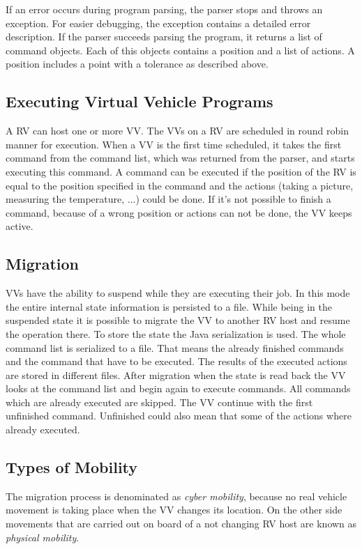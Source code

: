 If an error occurs during program parsing, the parser stops and throws an exception. For easier debugging, the exception
contains a detailed error description. If the parser succeeds parsing the program, it returns a list of command objects.
Each of this objects contains a position and a list of actions.
A position includes a point with a tolerance as described above.

\subsection{Executing Virtual Vehicle Programs}

A \ac{RV} can host one or more \ac{VV}. The \acp{VV} on a \ac{RV} are scheduled in round robin manner for
execution. When a \ac{VV} is the first time scheduled, it takes the first command from the command list, which was
returned from the parser, and starts executing this command. A command can be executed if the position of the \ac{RV} is
equal to the position specified in the command and the actions (taking a picture, measuring the temperature, ...) could be done.
If it's not possible to finish a command, because of a wrong position or actions can not be done, the \ac{VV} keeps
active.


\subsection{Migration}

\acp{VV} have the ability to suspend while they are executing their job. In this mode the entire internal state 
information is persisted to a file. While being in the suspended state it is possible to migrate the \ac{VV} to another
\ac{RV} host and resume the operation there. To store the state the Java serialization is used. The whole command
list is serialized to a file. That means the already finished commands and the command that have to be executed. The
results of the executed actions are stored in different files. After migration when the state is read back the \ac{VV}
looks at the command list and begin again to execute commands. All commands which are already executed are skipped. The
\ac{VV} continue with the first unfinished command. Unfinished could also mean that some of the actions where already
executed.


\subsection{Types of Mobility}
The migration process is denominated as \emph{cyber mobility}, because no real vehicle movement is taking place when the
\ac{VV} changes its location. On the other side movements that are carried out on board of a not changing \ac{RV} host
are known as \emph{physical mobility}.

